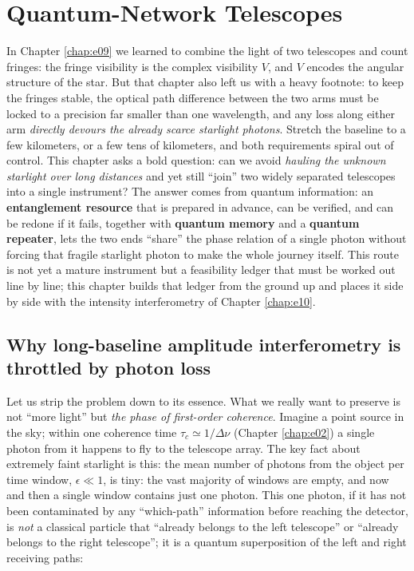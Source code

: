 \chapter{Quantum-Network Telescopes}
\label{chap:e24}

\begin{chapteropening}
In Chapter \ref{chap:e09} we learned to combine the light of two telescopes and count fringes: the fringe visibility is the complex visibility \(V\), and \(V\) encodes the angular structure of the star. But that chapter also left us with a heavy footnote: to keep the fringes stable, the optical path difference between the two arms must be locked to a precision far smaller than one wavelength, and any loss along either arm \emph{directly devours the already scarce starlight photons}. Stretch the baseline to a few kilometers, or a few tens of kilometers, and both requirements spiral out of control. This chapter asks a bold question: can we avoid \emph{hauling the unknown starlight over long distances} and yet still ``join'' two widely separated telescopes into a single instrument? The answer comes from quantum information: an \textbf{entanglement resource} that is prepared in advance, can be verified, and can be redone if it fails, together with \textbf{quantum memory} and a \textbf{quantum repeater}, lets the two ends ``share'' the phase relation of a single photon without forcing that fragile starlight photon to make the whole journey itself. This route is not yet a mature instrument but a feasibility ledger that must be worked out line by line; this chapter builds that ledger from the ground up and places it side by side with the intensity interferometry of Chapter \ref{chap:e10}.
\end{chapteropening}

\section{Why long-baseline amplitude interferometry is throttled by photon loss}
\label{sec:e24-why-loss}

Let us strip the problem down to its essence. What we really want to preserve is not ``more light'' but \emph{the phase of first-order coherence}. Imagine a point source in the sky; within one coherence time \(\tau_c\simeq1/\Delta\nu\) (Chapter \ref{chap:e02}) a single photon from it happens to fly to the telescope array. The key fact about extremely faint starlight is this: the mean number of photons from the object per time window, \(\epsilon\ll1\), is tiny: the vast majority of windows are empty, and now and then a single window contains just one photon. This one photon, if it has not been contaminated by any ``which-path'' information before reaching the detector, is \emph{not} a classical particle that ``already belongs to the left telescope'' or ``already belongs to the right telescope''; it is a quantum superposition of the left and right receiving paths:

